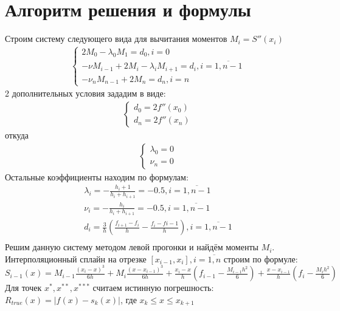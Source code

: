 \documentclass[10pt]{scrartcl}
\begin{document}
\section*{Алгоритм решения и формулы}\noindent
Строим систему следующего вида для вычитания моментов $M_i = S''(x_i)$
\begin{gather*}
\begin{cases}
2M_0 - \lambda_0 M_1 = d_0, i = 0\\
-\nu M_{i - 1} + 2M_i - \lambda_i M_{i + 1} = d_i, i =\overline{1, n - 1}\\
-\nu_n M_{n - 1} + 2M_n = d_n, i = n
\end{cases}
\end{gather*}
2 дополнительных условия зададим в виде:\\
\begin{gather*}
\begin{cases}
d_0 = 2f''(x_0)\\
d_n = 2f''(x_n)
\end{cases}
\end{gather*}
откуда
\begin{gather*}
\begin{cases}
\lambda_0 = 0\\
\nu_n = 0
\end{cases}
\end{gather*}
Остальные коэффициенты находим по формулам:
\begin{gather*}
\lambda_i = - \frac{h_i+1}{h_i+h_{i+1}} = -0.5, i = \overline{1, n - 1}\\
\nu_i = - \frac{h_i}{h_i + h_{i + 1}} = -0.5, i = \overline{1, n - 1}\\
d_i = \frac{3}{h}\left(\frac{f_{i + 1} - f_i}{h} - \frac{f_i - f{i - 1}}{h}\right), i = \overline{1, n - 1}\\
\end{gather*}
Решим данную систему методом левой прогонки и найдём моменты $M_i$.\\
Интерполяционный сплайн на отрезке $[x_{i-1}, x_i], i = \overline{1, n}$ строим по формуле:\\
$S_{i - 1}(x) = M_{i - 1}\frac{(x_i - x)^3}{6h} + M_i\frac{(x - x_{i - 1})^3}{6h} + \frac{x_i - x}{h}
\left(f_{i - 1} - \frac{M_{i - 1}h^2}{6}\right) + \frac{x - x_{i - 1}}{h}
\left(f_i - \frac{M_ih^2}{6}\right)$\\
Для точек $x^*, x^{**}, x^{***}$ считаем истинную погрешность:\\
$R_{true}(x) = |f(x) - s_k(x)|$, где $x_k \leq x \leq x_{k + 1}$
\end{document}
